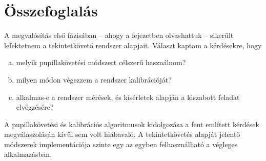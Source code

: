 \section{Összefoglalás}\label{sect:kiserlet_osszefoglalas}

A megvalósítás első fázisában -- ahogy a fejezetben olvashattuk -- sikerült lefektetnem a tekintetkövető rendszer alapjait. Választ kaptam a kérdésekre, hogy

\begin{enumerate}[a)]
 \item melyik pupillakövetési módszert célszerű használnom?
 \item milyen módon végezzem a rendszer kalibrációját?
 \item alkalmas-e a rendszer mérések, és kísérletek alapján a kiszabott feladat elvégzésére?
\end{enumerate} 

A pupillakövetési és kalibrációs algoritmusok kidolgozása a fent említett kérdések megválaszolásán kívül sem volt hiábavaló. A tekintetkövetés alapját jelentő módszerek implementációja szinte egy az egyben felhasználható a végleges alkalmazásban.